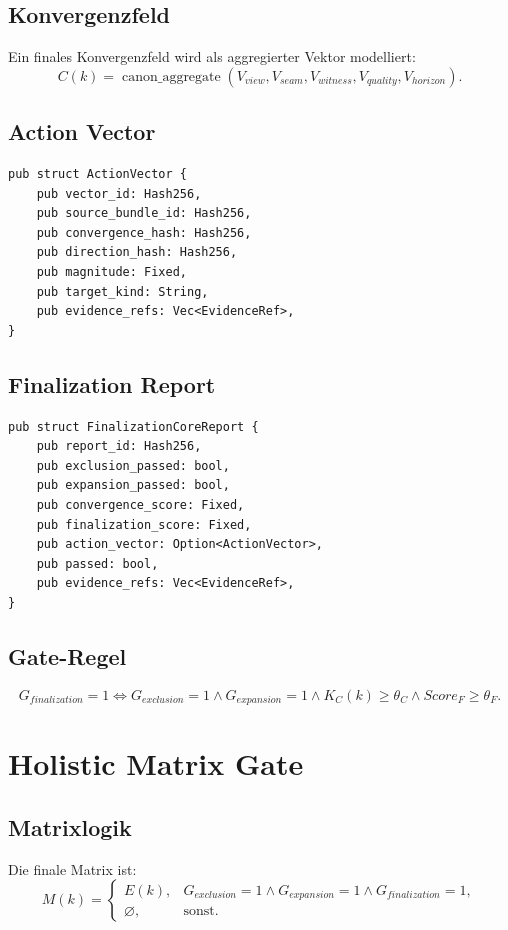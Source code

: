 \documentclass[11pt,a4paper]{article}
\begin{document}
\subsection{Konvergenzfeld}
Ein finales Konvergenzfeld wird als aggregierter Vektor modelliert:
\[
C(k)=\operatorname{canon\_aggregate}(V_{view},V_{seam},V_{witness},V_{quality},V_{horizon}).
\]

\subsection{Action Vector}
\begin{lstlisting}
pub struct ActionVector {
    pub vector_id: Hash256,
    pub source_bundle_id: Hash256,
    pub convergence_hash: Hash256,
    pub direction_hash: Hash256,
    pub magnitude: Fixed,
    pub target_kind: String,
    pub evidence_refs: Vec<EvidenceRef>,
}
\end{lstlisting}

\subsection{Finalization Report}
\begin{lstlisting}
pub struct FinalizationCoreReport {
    pub report_id: Hash256,
    pub exclusion_passed: bool,
    pub expansion_passed: bool,
    pub convergence_score: Fixed,
    pub finalization_score: Fixed,
    pub action_vector: Option<ActionVector>,
    pub passed: bool,
    pub evidence_refs: Vec<EvidenceRef>,
}
\end{lstlisting}

\subsection{Gate-Regel}
\[
G_{finalization}=1 \Longleftrightarrow
G_{exclusion}=1 \wedge G_{expansion}=1 \wedge K_C(k)\ge \theta_C \wedge Score_F\ge \theta_F.
\]

\section{Holistic Matrix Gate}

\subsection{Matrixlogik}
Die finale Matrix ist:
\[
M(k)=
\begin{cases}
E(k), & G_{exclusion}=1 \wedge G_{expansion}=1 \wedge G_{finalization}=1,\\
\varnothing, & \text{sonst.}
\end{cases}
\]
\end{document}
